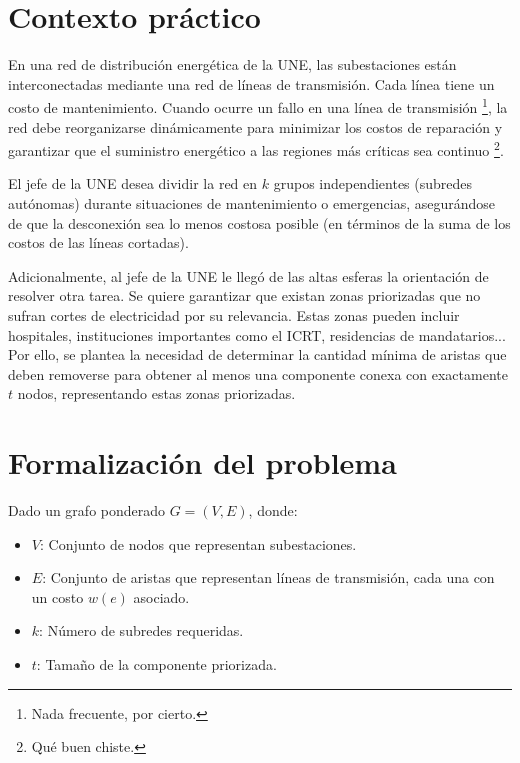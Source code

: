 


% 

\maketitle

\section*{Contexto práctico}
En una red de distribución energética de la UNE, 
las subestaciones están interconectadas mediante 
una red de líneas de transmisión. Cada línea tiene 
un costo de mantenimiento. 
Cuando ocurre un fallo en una línea de transmisión 
\footnote{Nada frecuente, por cierto.}, 
la red debe reorganizarse dinámicamente 
para minimizar los costos de reparación y garantizar 
que el suministro energético a las regiones más 
críticas sea continuo \footnote{Qué buen chiste.}.

El jefe de la UNE desea dividir la red en \( k \) 
grupos independientes (subredes autónomas) durante 
situaciones de mantenimiento o emergencias, 
asegurándose de que la desconexión sea lo menos 
costosa posible (en términos de la suma de los 
costos de las líneas cortadas).

Adicionalmente, al jefe de la UNE le llegó de las altas esferas
la orientación de resolver otra tarea. 
Se quiere garantizar que existan zonas priorizadas que 
no sufran cortes de electricidad por su relevancia. 
Estas zonas pueden incluir hospitales, instituciones importantes como el ICRT, 
residencias de mandatarios... 
Por ello, se plantea la necesidad de determinar la 
cantidad mínima de aristas que deben removerse para 
obtener al menos una componente conexa con 
exactamente \( t \) nodos, representando estas zonas 
priorizadas.

\section*{Formalización del problema}
Dado un grafo ponderado \( G = (V, E) \), donde:
\begin{itemize}
    \item \( V \): Conjunto de nodos que representan subestaciones.
    \item \( E \): Conjunto de aristas que representan líneas de transmisión, cada una con un costo \( w(e) \) asociado.
    \item \( k \): Número de subredes requeridas.
    \item \( t \): Tamaño de la componente priorizada.
\end{itemize}

